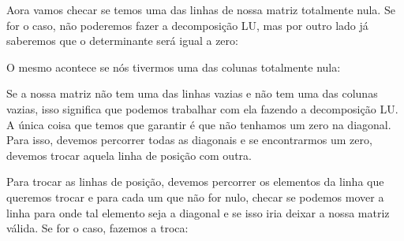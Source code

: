 Aora vamos checar se temos uma das linhas de nossa matriz totalmente
nula. Se for o caso, não poderemos fazer a decomposição LU, mas por
outro lado já saberemos que o determinante será igual a zero:


O mesmo acontece se nós tivermos uma das colunas totalmente nula:


Se a nossa matriz não tem uma das linhas vazias e não tem uma das
colunas vazias, isso significa que podemos trabalhar com ela fazendo a
decomposição LU. A única coisa que temos que garantir é que não
tenhamos um zero na diagonal. Para isso, devemos percorrer todas as
diagonais e se encontrarmos um zero, devemos trocar aquela linha de
posição com outra.

Para trocar as linhas de posição, devemos percorrer os elementos da
linha que queremos trocar e para cada um que não for nulo, checar se
podemos mover a linha para onde tal elemento seja a diagonal e se isso
iria deixar a nossa matriz válida. Se for o caso, fazemos a troca:


